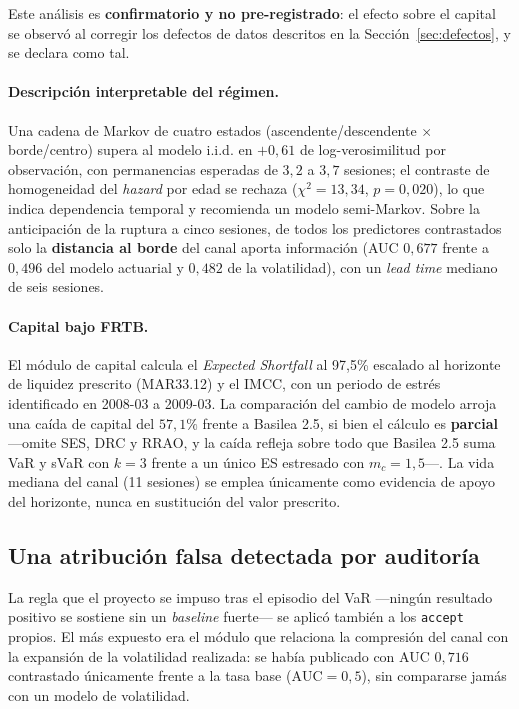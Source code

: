 \documentclass[11pt,a4paper]{article}
\begin{document}
Este análisis es \textbf{confirmatorio y no pre-registrado}: el efecto sobre el
capital se observó al corregir los defectos de datos descritos en la
Sección~\ref{sec:defectos}, y se declara como tal.

\paragraph{Descripción interpretable del régimen.} Una cadena de Markov de cuatro
estados (ascendente/descendente $\times$ borde/centro) supera al modelo i.i.d. en
$+0{,}61$ de log-verosimilitud por observación, con permanencias esperadas de
$3{,}2$ a $3{,}7$ sesiones; el contraste de homogeneidad del \emph{hazard} por
edad se rechaza ($\chi^2=13{,}34$, $p=0{,}020$), lo que indica dependencia
temporal y recomienda un modelo semi-Markov. Sobre la anticipación de la ruptura
a cinco sesiones, de todos los predictores contrastados solo la \textbf{distancia
al borde} del canal aporta información (AUC $0{,}677$ frente a $0{,}496$ del
modelo actuarial y $0{,}482$ de la volatilidad), con un \emph{lead time} mediano
de seis sesiones.

\paragraph{Capital bajo FRTB.} El módulo de capital calcula el \emph{Expected
Shortfall} al 97{,}5\% escalado al horizonte de liquidez prescrito (MAR33.12) y
el IMCC, con un periodo de estrés identificado en 2008-03 a 2009-03. La
comparación del cambio de modelo arroja una caída de capital del $57{,}1\%$
frente a Basilea 2.5, si bien el cálculo es \textbf{parcial} —omite SES, DRC y
RRAO, y la caída refleja sobre todo que Basilea 2.5 suma VaR y sVaR con $k=3$
frente a un único ES estresado con $m_c=1{,}5$—. La vida mediana del canal
(11 sesiones) se emplea únicamente como evidencia de apoyo del horizonte, nunca
en sustitución del valor prescrito.

\subsection{Una atribución falsa detectada por auditoría}
\label{sec:auditvol}
La regla que el proyecto se impuso tras el episodio del VaR —ningún resultado
positivo se sostiene sin un \emph{baseline} fuerte— se aplicó también a los
\texttt{accept} propios. El más expuesto era el módulo que relaciona la
compresión del canal con la expansión de la volatilidad realizada: se había
publicado con AUC $0{,}716$ contrastado únicamente frente a la tasa base
($\mathrm{AUC}=0{,}5$), sin compararse jamás con un modelo de volatilidad.
\end{document}
